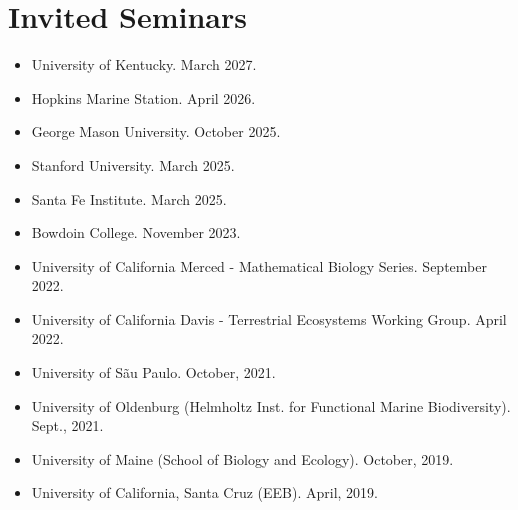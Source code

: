 \documentclass[margin,line,12pt]{res}
\begin{document}
\begin{resume}
\begin{itemize}
\end{itemize}


\section{\sc Invited Seminars}
\begin{itemize}

\item University of Kentucky. March 2027.

\item Hopkins Marine Station. April 2026.

\item George Mason University. October 2025.

\item Stanford University. March 2025.

\item Santa Fe Institute. March 2025.

\item Bowdoin College. November 2023.

\item University of California Merced - Mathematical Biology Series. September 2022.

\item University of California Davis - Terrestrial Ecosystems Working Group. April 2022.

\item University of S\~au Paulo. October, 2021.

\item University of Oldenburg (Helmholtz Inst. for Functional Marine Biodiversity). Sept., 2021.

\item University of Maine (School of Biology and Ecology). October, 2019.

\item University of California, Santa Cruz (EEB). April, 2019.


\end{itemize}
\end{resume}
\end{document}
